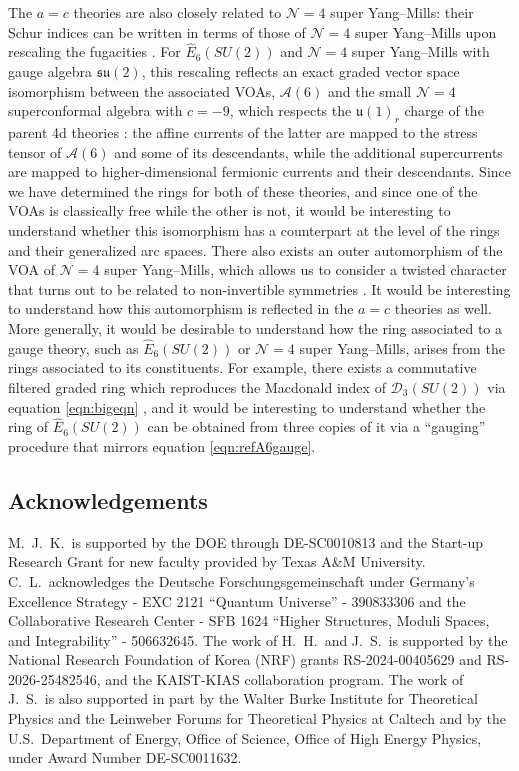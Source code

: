 \documentclass[12pt]{article}
\numberwithin{equation}{section}
\numberwithin{figure}{section}
\theoremstyle{plain}
\theoremstyle{definition}
\begin{document}
The $a = c$ theories are also closely related to $\mathcal{N}=4$ super Yang--Mills: their Schur indices can be written in terms of those of $\mathcal{N}=4$ super Yang--Mills upon rescaling the fugacities \cite{Kang:2021lic}. For $\widehat{E}_6(SU(2))$ and $\mathcal{N}=4$ super Yang--Mills with gauge algebra $\mathfrak{su}(2)$, this rescaling reflects an exact graded vector space isomorphism between the associated VOAs, $\mathcal{A}(6)$ and the small $\mathcal{N}=4$ superconformal algebra with $c = -9$, which respects the $\mathfrak{u}(1)_r$ charge of the parent 4d theories \cite{Buican:2020moo}: the affine currents of the latter are mapped to the stress tensor of $\mathcal{A}(6)$ and some of its descendants, while the additional supercurrents are mapped to higher-dimensional fermionic currents and their descendants. Since we have determined the rings for both of these theories, and since one of the VOAs is classically free while the other is not, it would be interesting to understand whether this isomorphism has a counterpart at the level of the rings and their generalized arc spaces. There also exists an outer automorphism of the VOA of $\mathcal{N}=4$ super Yang--Mills, which allows us to consider a twisted character that turns out to be related to non-invertible symmetries \cite{Maruyoshi:2026cmr}. It would be interesting to understand how this automorphism is reflected in the $a=c$ theories as well. More generally, it would be desirable to understand how the ring associated to a gauge theory, such as $\widehat{E}_6(SU(2))$ or $\mathcal{N}=4$ super Yang--Mills, arises from the rings associated to its constituents. For example, there exists a commutative filtered graded ring which reproduces the Macdonald index of $\mathcal{D}_3(SU(2))$ via equation \eqref{eqn:bigeqn} \cite{Andrews:2025krn,Kang:2025zub}, and it would be interesting to understand whether the ring of $\widehat{E}_6(SU(2))$ can be obtained from three copies of it via a ``gauging'' procedure that mirrors equation \eqref{eqn:refA6gauge}.

\vspace{0.3cm}
\subsection*{Acknowledgements}
M.~J.~K.~is supported by the DOE through DE-SC0010813 and the Start-up Research Grant for new faculty provided by Texas A\&M University.
C.~L.~acknowledges the Deutsche Forschungsgemeinschaft under Germany's Excellence Strategy - EXC 2121 ``Quantum Universe'' - 390833306 and the Collaborative Research Center - SFB 1624 ``Higher Structures, Moduli Spaces, and Integrability'' - 506632645. The work of H.~H.~and J.~S.~is supported by the National Research Foundation of Korea (NRF) grants RS-2024-00405629 and RS-2026-25482546, and the KAIST-KIAS collaboration program. The work of J.~S.~is also supported in part by the Walter Burke Institute for Theoretical Physics and the Leinweber Forums for Theoretical Physics at Caltech and by the U.S.~Department of Energy, Office of Science, Office of High Energy Physics, under Award Number DE-SC0011632.

{}

\end{document}
